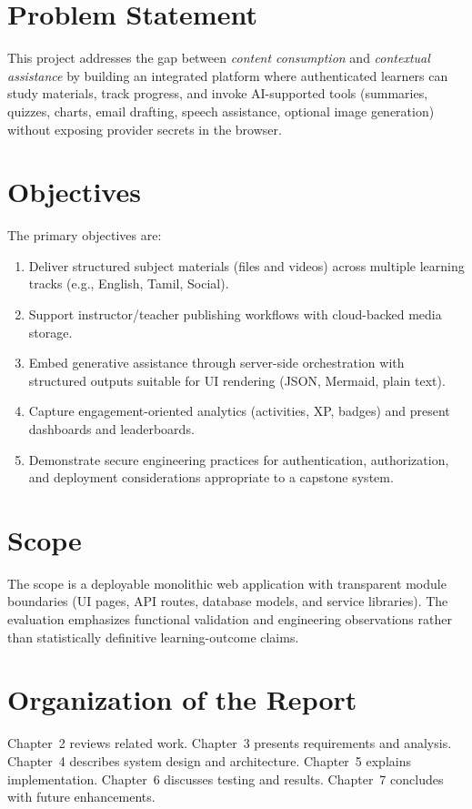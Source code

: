 \documentclass[a4paper,12pt,openany]{report}
\begin{document}
\section{Problem Statement}
This project addresses the gap between \textit{content consumption} and \textit{contextual assistance} by building an integrated platform where authenticated learners can study materials, track progress, and invoke AI-supported tools (summaries, quizzes, charts, email drafting, speech assistance, optional image generation) without exposing provider secrets in the browser.

\section{Objectives}
The primary objectives are:
\begin{enumerate}[label=\textbf{O\arabic*:}, leftmargin=*]
\item Deliver structured subject materials (files and videos) across multiple learning tracks (e.g., English, Tamil, Social).
\item Support instructor/teacher publishing workflows with cloud-backed media storage.
\item Embed generative assistance through server-side orchestration with structured outputs suitable for UI rendering (JSON, Mermaid, plain text).
\item Capture engagement-oriented analytics (activities, XP, badges) and present dashboards and leaderboards.
\item Demonstrate secure engineering practices for authentication, authorization, and deployment considerations appropriate to a capstone system.
\end{enumerate}

\section{Scope}
The scope is a deployable monolithic web application with transparent module boundaries (UI pages, API routes, database models, and service libraries). The evaluation emphasizes functional validation and engineering observations rather than statistically definitive learning-outcome claims.

\section{Organization of the Report}
Chapter~2 reviews related work. Chapter~3 presents requirements and analysis. Chapter~4 describes system design and architecture. Chapter~5 explains implementation. Chapter~6 discusses testing and results. Chapter~7 concludes with future enhancements.
\end{document}
